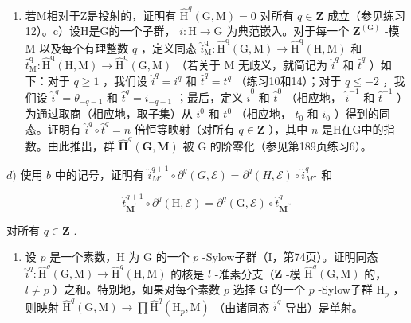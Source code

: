 \begin{enumerate}
\def\labelenumi{\alph{enumi})}
\setcounter{enumi}{1}
\tightlist
\item
  若M相对于Z是投射的，证明有 \(\hat{\mathrm{H}}^{q}(\mathrm{G},\mathrm{M}) = 0\) 对所有 \(q\in \mathbf{Z}\) 成立（参见练习12）。c）设H是G的一个子群， \(i:\mathrm{H}\to \mathrm{G}\) 为典范嵌入。对于每一个 \(\mathbf{Z}^{(\mathrm{G})}\) -模 M 以及每个有理整数 \(q\) ，定义同态 \(\hat{i}_{\mathrm{M}}^{\mathrm{q}}:\hat{\mathrm{H}}^{\mathrm{q}}(\mathrm{G},\mathrm{M})\rightarrow \hat{\mathrm{H}}^{\mathrm{q}}(\mathrm{H},\mathrm{M})\) 和 \(\hat{t}_{\mathrm{M}}^{\mathrm{q}}:\hat{\mathrm{H}}^{\mathrm{q}}(\mathrm{H},\mathrm{M})\rightarrow \hat{\mathrm{H}}^{\mathrm{q}}(\mathrm{G},\mathrm{M})\) （若关于 M 无歧义，就简记为 \(\hat{i}^q\) 和 \(\hat{t}^q\) ）如下：对于 \(q\geqslant 1\) ，我们设 \(\hat{i}^q = i^q\) 和 \(\hat{t}^q = t^q\) （练习10和14）；对于 \(q\leqslant -2\) ，我们设 \(\hat{i}^q = \theta_{-q - 1}\) 和 \(\hat{t}^q = i_{-q - 1}\) ；最后，定义 \(\hat{i}^0\) 和 \(\hat{t}^0\) （相应地， \(\hat{i}^{-1}\) 和 \(\hat{t}^{-1}\) ）为通过取商（相应地，取子集）从 \(i^0\) 和 \(t^0\) （相应地， \(t_0\) 和 \(i_0\) ）得到的同态。证明有 \(\hat{i}^q\circ \hat{t}^q = n\) 倍恒等映射（对所有 \(q\in \mathbf{Z}\) ），其中 \(n\) 是H在G中的指数。由此推出，群 \(\hat{\mathbf{H}}^{q}(\mathbf{G},\mathbf{M})\) 被 G 的阶零化（参见第189页练习6）。
\end{enumerate}

\(d)\) 使用 \(b\) 中的记号，证明有 \(\hat{i}_{M'}^{q+1} \circ \partial^q(G, \mathcal{E}) = \partial^q(H, \mathcal{E}) \circ \hat{i}_{M''}^q\) 和

\[
\hat {t} _ {\mathbf {M} ^ {\prime}} ^ {q + 1} \circ \partial^ {q} (\mathrm{H}, \mathcal {E}) = \partial^ {q} (\mathrm{G}, \mathcal {E}) \circ \hat {t} _ {\mathbf {M} ^ {\prime \prime}} ^ {q}
\]

对所有 \(q \in \mathbf{Z}\) .

\begin{enumerate}
\def\labelenumi{\alph{enumi})}
\setcounter{enumi}{4}
\tightlist
\item
  设 \(p\) 是一个素数，H 为 G 的一个 \(p\) -Sylow子群（I，第74页）。证明同态 \(\hat{i}^q: \hat{\mathrm{H}}^q(\mathrm{G}, \mathrm{M}) \to \hat{\mathrm{H}}^q(\mathrm{H}, \mathrm{M})\) 的核是 \(l\) -准素分支（\(\mathbf{Z}\) -模 \(\hat{\mathrm{H}}^q(\mathrm{G}, \mathrm{M})\) 的， \(l \neq p\) ）之和。特别地，如果对每个素数 \(p\) 选择 G 的一个 \(p\) -Sylow子群 \(\mathrm{H}_p\) ，则映射 \(\hat{\mathrm{H}}^q(\mathrm{G}, \mathrm{M}) \to \prod \hat{\mathrm{H}}^q(\mathrm{H}_p, \mathrm{M})\) （由诸同态 \(\hat{i}^q\) 导出）是单射。
\end{enumerate}

